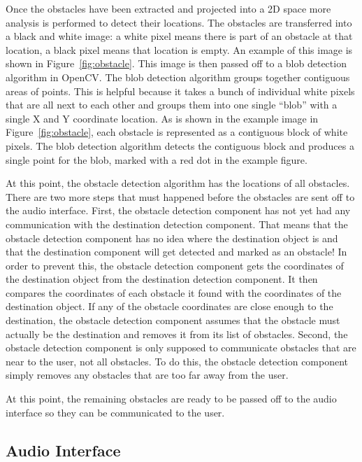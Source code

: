Once the obstacles have been extracted and projected into a 2D space more
analysis is performed to detect their locations. The obstacles are transferred
into a black and white image: a white pixel means there is part of an obstacle
at that location, a black pixel means that location is empty. An example of this
image is shown in Figure~\ref{fig:obstacle}. This image is then
passed off to a blob detection algorithm in OpenCV\cite{opencv-website}. The
blob detection algorithm groups together contiguous areas of points. This is
helpful because it takes a bunch of individual white pixels that are all next to
each other and groups them into one single ``blob'' with a single X and Y
coordinate location. As is shown in the example image in
Figure~\ref{fig:obstacle}, each obstacle is represented as a contiguous block
of white pixels. The blob detection algorithm detects the contiguous block and
produces a single point for the blob, marked with a red dot in the example
figure.

At this point, the obstacle detection algorithm has the locations of all
obstacles. There are two more steps that must happened before the obstacles are
sent off to the audio interface. First, the obstacle detection component has not
yet had any communication with the destination detection component. That means
that the obstacle detection component has no idea where the destination object is
and that the destination component will get detected and marked as an obstacle!
In order to prevent this, the obstacle detection component gets the coordinates
of the destination object from the destination detection component. It then
compares the coordinates of each obstacle it found with the coordinates of the
destination object. If any of the obstacle coordinates are close enough to the
destination, the obstacle detection component assumes that the obstacle must
actually be the destination and removes it from its list of obstacles. Second,
the obstacle detection component is only supposed to communicate obstacles that
are near to the user, not all obstacles. To do this, the obstacle detection
component simply removes any obstacles that are too far away from the user.

At this point, the remaining obstacles are ready to be passed off to the audio
interface so they can be communicated to the user.

\subsection{Audio Interface}
\label{sec:technical-audio}

